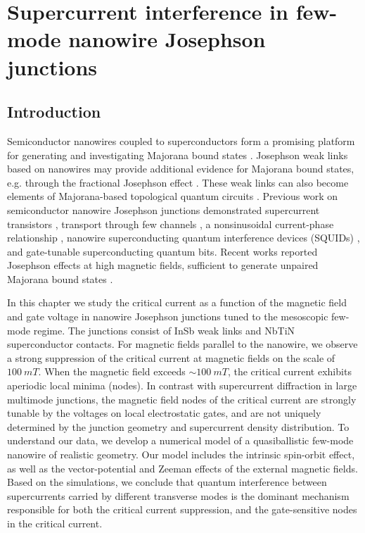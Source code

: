 \chapter{Supercurrent interference in few-mode nanowire Josephson junctions}
\label{ch:supercurrent}

\newpage
\noindent
\section{Introduction}

Semiconductor nanowires coupled to superconductors form a promising platform for generating and investigating Majorana bound states \cite{Kitaev2001,Oreg2010,Lutchyn2010,Mourik2012,Deng2016,Albrecht2016,Chen2017}.
Josephson weak links based on nanowires may provide additional evidence for Majorana bound states, e.g. through the fractional Josephson effect \cite{Wiedenmann2015,Bocquillon2016,Deacon2017}.
These weak links can also become elements of Majorana-based topological quantum circuits \cite{Hyart2013, Aasen2016, Karzig2017, Plugge2017b}.
Previous work on semiconductor nanowire Josephson junctions demonstrated supercurrent transistors \cite{Doh2005}, transport through few channels \cite{Goffman2017}, a nonsinusoidal current-phase relationship \cite{Spanton2017}, nanowire superconducting quantum interference devices (SQUIDs) \cite{VanDam2006,Szombati2016}, and gate-tunable superconducting quantum bits\cite{Lange2015,Larsen2015}.
Recent works reported Josephson effects at high magnetic fields, sufficient to generate unpaired Majorana bound states \cite{Szombati2016,Paajaste2015,Tiira2017,Gharavi2017}.

In this chapter we study the critical current as a function of the magnetic field and gate voltage in nanowire Josephson junctions tuned to the mesoscopic few-mode regime.
The junctions consist of InSb weak links and NbTiN superconductor contacts.
For magnetic fields parallel to the nanowire, we observe a strong suppression of the critical current at magnetic fields on the scale of $\SI{100}{mT}$.
When the magnetic field exceeds $\sim \SI{100}{mT}$, the critical current exhibits aperiodic local minima (nodes).
In contrast with supercurrent diffraction in large multimode junctions, the magnetic field nodes of the critical current are strongly tunable by the voltages on local electrostatic gates, and are not uniquely determined by the junction geometry and supercurrent density distribution.
To understand our data, we develop a numerical model of a quasiballistic few-mode nanowire of realistic geometry.
Our model includes the intrinsic spin-orbit effect, as well as the vector-potential and Zeeman effects of the external magnetic fields.
Based on the simulations, we conclude that quantum interference between supercurrents carried by different transverse modes is the dominant mechanism responsible for both the critical current suppression, and the gate-sensitive nodes in the critical current.

